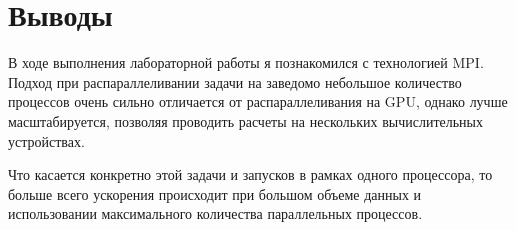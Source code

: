 \section{Выводы}
В ходе выполнения лабораторной работы я познакомился с технологией MPI. Подход при распараллеливании задачи на заведомо небольшое количество процессов очень сильно отличается от распараллеливания на GPU, однако лучше масштабируется, позволяя проводить расчеты на нескольких вычислительных устройствах.

Что касается конкретно этой задачи и запусков в рамках одного процессора, то больше всего ускорения происходит при большом объеме данных и использовании максимального количества параллельных процессов.
\pagebreak
